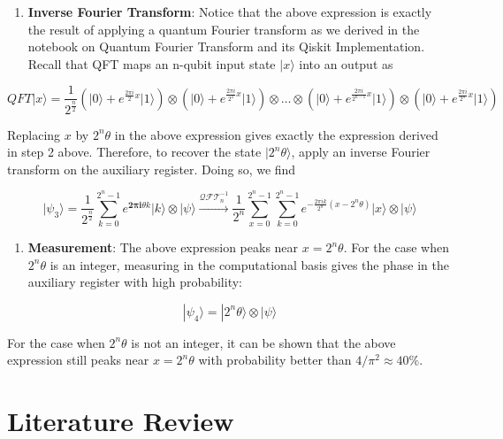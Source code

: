 \documentclass{article}
\begin{document}
\begin{enumerate}
\def\labelenumi{\roman{enumi}.}
\setcounter{enumi}{3}
\tightlist
\item
  \textbf{Inverse Fourier Transform}: Notice that the above expression
  is exactly the result of applying a quantum Fourier transform as we
  derived in the notebook on
  Quantum Fourier Transform and its Qiskit Implementation. Recall that QFT maps
  an n-qubit input state \(\vert x\rangle\) into an output as
\end{enumerate}

\[
QFT\vert x \rangle = \frac{1}{2^\frac{n}{2}}
\left(\vert0\rangle + e^{\frac{2\pi i}{2}x} \vert1\rangle\right) 
\otimes
\left(\vert0\rangle + e^{\frac{2\pi i}{2^2}x} \vert1\rangle\right) 
\otimes  
\ldots
\otimes
\left(\vert0\rangle + e^{\frac{2\pi i}{2^{n-1}}x} \vert1\rangle\right) 
\otimes
\left(\vert0\rangle + e^{\frac{2\pi i}{2^n}x} \vert1\rangle\right) 
\]

Replacing \(x\) by \(2^n\theta\) in the above expression gives exactly
the expression derived in step 2 above. Therefore, to recover the state
\(\vert2^n\theta\rangle\), apply an inverse Fourier transform on the
auxiliary register. Doing so, we find

\[
\vert\psi_3\rangle = \frac {1}{2^{\frac {n}{2}}}\sum _{k=0}^{2^{n}-1}e^{\boldsymbol{2\pi i} \theta k}|k\rangle \otimes | \psi \rangle \xrightarrow{\mathcal{QFT}_n^{-1}} \frac {1}{2^n}\sum _{x=0}^{2^{n}-1}\sum _{k=0}^{2^{n}-1} e^{-\frac{2\pi i k}{2^n}(x - 2^n \theta)} |x\rangle \otimes |\psi\rangle
\]

\begin{enumerate}
\def\labelenumi{\alph{enumi}.}
\setcounter{enumi}{21}
\tightlist
\item
  \textbf{Measurement}: The above expression peaks near
  \(x = 2^n\theta\). For the case when \(2^n\theta\) is an integer,
  measuring in the computational basis gives the phase in the auxiliary
  register with high probability:
\end{enumerate}

\[ |\psi_4\rangle = | 2^n \theta \rangle \otimes | \psi \rangle\]

For the case when \(2^n\theta\) is not an integer, it can be shown that
the above expression still peaks near \(x = 2^n\theta\) with probability
better than \(4/\pi^2 \approx 40\%\).

\newpage


\section{Literature Review}
\end{document}
